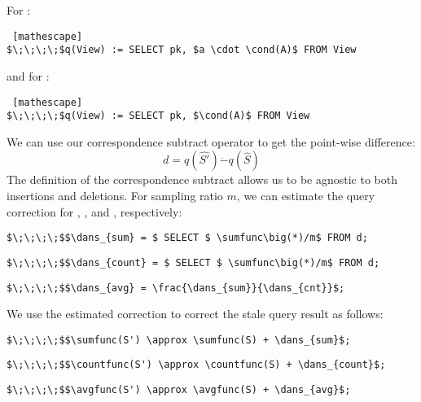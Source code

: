 \vspace{.5em}

\noindent For \sumfunc:
\begin{lstlisting} [mathescape]
$\;\;\;\;$q(View) := SELECT pk, $a \cdot \cond(A)$ FROM View
\end{lstlisting}

\noindent and for \countfunc:
\begin{lstlisting} [mathescape]
$\;\;\;\;$q(View) := SELECT pk, $\cond(A)$ FROM View
\end{lstlisting}

We can use our correspondence subtract operator to get the point-wise difference:
\[d = q(\hat{S'}) \dot{-} q(\hat{S})\]  
The definition of the correspondence subtract allows us to be agnostic to both insertions and deletions.
For sampling ratio $m$, we can estimate the query correction for \sumfunc, \countfunc, and \avgfunc, respectively:
\begin{lstlisting}[mathescape,basicstyle={\scriptsize}]
$\;\;\;\;$$\dans_{sum} = $ SELECT $ \sumfunc\big(*)/m$ FROM d;
\end{lstlisting}
\vspace{-1em}
\begin{lstlisting}[mathescape,basicstyle={\scriptsize}]
$\;\;\;\;$$\dans_{count} = $ SELECT $ \sumfunc\big(*)/m$ FROM d;
\end{lstlisting}
\vspace{-1em}
\begin{lstlisting}[mathescape,basicstyle={\scriptsize}]
$\;\;\;\;$$\dans_{avg} = \frac{\dans_{sum}}{\dans_{cnt}}$;
\end{lstlisting}
We use the estimated correction to correct the stale query result as follows:
\begin{lstlisting}[mathescape,basicstyle={\scriptsize}]
$\;\;\;\;$$\sumfunc(S') \approx \sumfunc(S) + \dans_{sum}$;
\end{lstlisting}
\vspace{-1em}
\begin{lstlisting}[mathescape,basicstyle={\scriptsize}]
$\;\;\;\;$$\countfunc(S') \approx \countfunc(S) + \dans_{count}$;
\end{lstlisting}
\vspace{-1em}
\begin{lstlisting}[mathescape,basicstyle={\scriptsize}]
$\;\;\;\;$$\avgfunc(S') \approx \avgfunc(S) + \dans_{avg}$;
\end{lstlisting}

